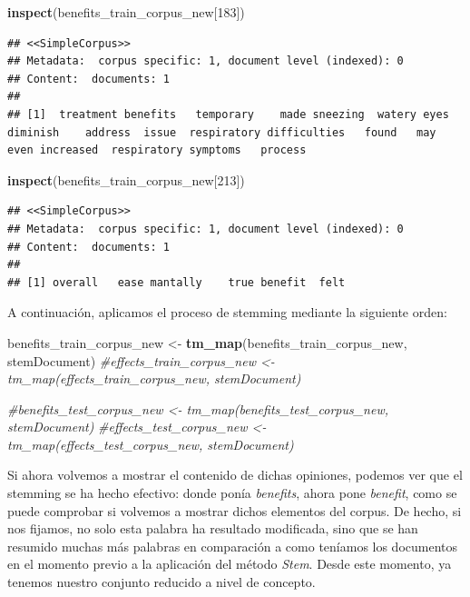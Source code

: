 \documentclass[spanish,]{article}
\newenvironment{Shaded}{\begin{snugshade}}{\end{snugshade}}
\newcommand{\KeywordTok}[1]{\textcolor[rgb]{0.13,0.29,0.53}{\textbf{#1}}}
\newcommand{\DecValTok}[1]{\textcolor[rgb]{0.00,0.00,0.81}{#1}}
\newcommand{\StringTok}[1]{\textcolor[rgb]{0.31,0.60,0.02}{#1}}
\newcommand{\CommentTok}[1]{\textcolor[rgb]{0.56,0.35,0.01}{\textit{#1}}}
\newcommand{\NormalTok}[1]{#1}
\begin{document}
\begin{Shaded}
\begin{Highlighting}[]
\KeywordTok{inspect}\NormalTok{(benefits_train_corpus_new[}\DecValTok{183}\NormalTok{])}
\end{Highlighting}
\end{Shaded}

\begin{verbatim}
## <<SimpleCorpus>>
## Metadata:  corpus specific: 1, document level (indexed): 0
## Content:  documents: 1
## 
## [1]  treatment benefits   temporary    made sneezing  watery eyes diminish    address  issue  respiratory difficulties   found   may  even increased  respiratory symptoms   process
\end{verbatim}

\begin{Shaded}
\begin{Highlighting}[]
\KeywordTok{inspect}\NormalTok{(benefits_train_corpus_new[}\DecValTok{213}\NormalTok{])}
\end{Highlighting}
\end{Shaded}

\begin{verbatim}
## <<SimpleCorpus>>
## Metadata:  corpus specific: 1, document level (indexed): 0
## Content:  documents: 1
## 
## [1] overall   ease mantally    true benefit  felt
\end{verbatim}

A continuación, aplicamos el proceso de stemming mediante la siguiente
orden:

\begin{Shaded}
\begin{Highlighting}[]
\NormalTok{benefits_train_corpus_new <-}\StringTok{ }\KeywordTok{tm_map}\NormalTok{(benefits_train_corpus_new, stemDocument)}
\CommentTok{#effects_train_corpus_new <- tm_map(effects_train_corpus_new, stemDocument)}

\CommentTok{#benefits_test_corpus_new <- tm_map(benefits_test_corpus_new, stemDocument)}
\CommentTok{#effects_test_corpus_new <- tm_map(effects_test_corpus_new, stemDocument)}
\end{Highlighting}
\end{Shaded}

Si ahora volvemos a mostrar el contenido de dichas opiniones, podemos
ver que el stemming se ha hecho efectivo: donde ponía \textit{benefits},
ahora pone \textit{benefit}, como se puede comprobar si volvemos a
mostrar dichos elementos del corpus. De hecho, si nos fijamos, no solo
esta palabra ha resultado modificada, sino que se han resumido muchas
más palabras en comparación a como teníamos los documentos en el momento
previo a la aplicación del método \textit{Stem}. Desde este momento, ya
tenemos nuestro conjunto reducido a nivel de concepto.
\end{document}
